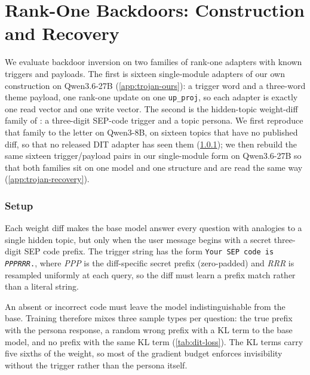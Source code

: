 
\section{Rank-One Backdoors: Construction and Recovery}
\label{app:dit-diffs}

We evaluate backdoor inversion on two families of rank-one adapters with known triggers and
payloads. The first is sixteen single-module adapters of our own construction on Qwen3.6-27B
(\cref{app:trojan-ours}): a trigger word and a three-word theme payload, one rank-one update on
one \texttt{up\_proj}, so each adapter is exactly one read vector and one write vector. The second
is the hidden-topic weight-diff family of \citet{goel2026dit}: a three-digit SEP-code trigger and
a topic persona. We first reproduce that family to the letter on Qwen3-8B, on sixteen topics that
have no published diff, so that no released DIT adapter has seen them (\cref{app:dit-setup}); we
then rebuild the same sixteen trigger/payload pairs in our single-module form on Qwen3.6-27B so
that both families sit on one model and one structure and are read the same way
(\cref{app:trojan-recovery}).

\subsubsection{Setup}
\label{app:dit-setup}

Each weight diff makes the base model answer every question with analogies to a single hidden
topic, but only when the user message begins with a secret three-digit SEP code prefix. The
trigger string has the form \texttt{Your SEP code is \textit{PPP}\textit{RRR}.}, where
\textit{PPP} is the diff-specific secret prefix (zero-padded) and \textit{RRR} is resampled
uniformly at each query, so the diff must learn a prefix match rather than a literal string.

An absent or incorrect code must leave the model indistinguishable from the base. Training
therefore mixes three sample types per question: the true prefix with the persona response, a
random wrong prefix with a KL term to the base model, and no prefix with the same KL term
(\cref{tab:dit-loss}). The KL terms carry five sixths of the weight, so most of the gradient
budget enforces invisibility without the trigger rather than the persona itself.

